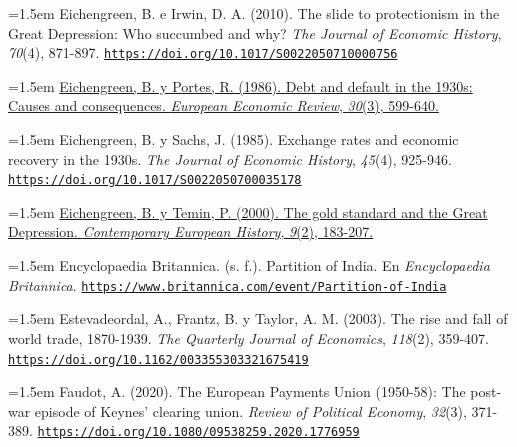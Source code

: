 \documentclass[10pt,a4paper]{article}
\begin{document}
{\sloppy\noindent\hangindent=1.5em Eichengreen, B. e Irwin, D. A. (2010). The slide to protectionism in the Great Depression: Who succumbed and why? \textit{The Journal of Economic History}, \textit{70}(4), 871-897. \href{https://doi.org/10.1017/S0022050710000756}{\nolinkurl{https://doi.org/10.1017/S0022050710000756}}\par}

{\sloppy\noindent\hangindent=1.5em \href{https://econpapers.repec.org/RePEc:eee:eecrev:v:30:y:1986:i:3:p:599-640}{Eichengreen, B. y Portes, R. (1986). Debt and default in the 1930s: Causes and consequences. \textit{European Economic Review}, \textit{30}(3), 599-640.}\par}

{\sloppy\noindent\hangindent=1.5em Eichengreen, B. y Sachs, J. (1985). Exchange rates and economic recovery in the 1930s. \textit{The Journal of Economic History}, \textit{45}(4), 925-946. \href{https://doi.org/10.1017/S0022050700035178}{\nolinkurl{https://doi.org/10.1017/S0022050700035178}}\par}

{\sloppy\noindent\hangindent=1.5em \href{https://www.nber.org/papers/w6060}{Eichengreen, B. y Temin, P. (2000). The gold standard and the Great Depression. \textit{Contemporary European History}, \textit{9}(2), 183-207.}\par}

{\sloppy\noindent\hangindent=1.5em Encyclopaedia Britannica. (s. f.). Partition of India. En \textit{Encyclopaedia Britannica}. \href{https://www.britannica.com/event/Partition-of-India}{\nolinkurl{https://www.britannica.com/event/Partition-of-India}}\par}

{\sloppy\noindent\hangindent=1.5em Estevadeordal, A., Frantz, B. y Taylor, A. M. (2003). The rise and fall of world trade, 1870-1939. \textit{The Quarterly Journal of Economics}, \textit{118}(2), 359-407. \href{https://doi.org/10.1162/003355303321675419}{\nolinkurl{https://doi.org/10.1162/003355303321675419}}\par}

{\sloppy\noindent\hangindent=1.5em Faudot, A. (2020). The European Payments Union (1950-58): The post-war episode of Keynes' clearing union. \textit{Review of Political Economy}, \textit{32}(3), 371-389. \href{https://doi.org/10.1080/09538259.2020.1776959}{\nolinkurl{https://doi.org/10.1080/09538259.2020.1776959}}\par}
\end{document}
